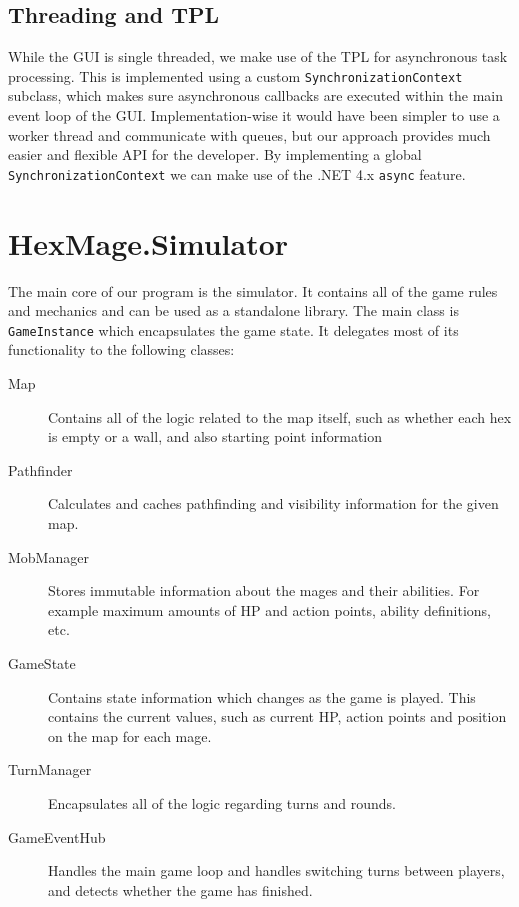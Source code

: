 \subsection{Threading and TPL}
\label{threading-tpl}

While the GUI is single threaded, we make use of the TPL for asynchronous task processing. This is implemented using a custom \verb|SynchronizationContext| subclass, which makes sure asynchronous callbacks are executed within the main event loop of the GUI. Implementation-wise it would have been simpler to use a worker thread and communicate with queues, but our approach provides much easier and flexible API for the developer. By implementing a global \verb|SynchronizationContext| we can make use of the .NET 4.x \verb|async| \citep{async} feature. 


\section{HexMage.Simulator}
\label{sec:simulator}

The main core of our program is the simulator. It contains all of the game rules and mechanics and can be used as a standalone library. The main class is \verb|GameInstance| which encapsulates the game state. It delegates most of its functionality to the following classes:

\begin{description}
	\item[Map] Contains all of the logic related to the map itself, such as whether each hex is empty or a wall, and also starting point information
	
	\item[Pathfinder] Calculates and caches pathfinding and visibility information for the given map.
	
	\item[MobManager] Stores immutable information about the mages and their abilities. For example maximum amounts of HP and action points, ability definitions, etc.
	
	\item[GameState] Contains state information which changes as the game is played. This contains the current values, such as current HP, action points and position on the map for each mage.
	
	\item[TurnManager] Encapsulates all of the logic regarding turns and rounds.
	
	\item[GameEventHub] Handles the main game loop and handles switching turns between players, and detects whether the game has finished.
\end{description}

